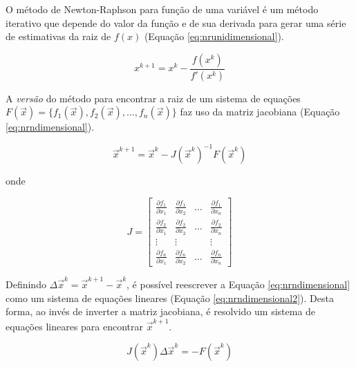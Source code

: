 \documentclass[final,5p]{elsarticle}
\numberwithin{equation}{section}
\begin{document}
        O método de Newton-Raphson para função de uma variável é um método iterativo que depende do valor da função e de sua derivada para gerar uma série de estimativas da raiz de $f(x)$ (Equação \ref{eq:nrunidimensional}).

        \begin{equation}
            x^{k+1} = x^{k} - \frac{f(x^k)}{f'(x^k)} \label{eq:nrunidimensional}
        \end{equation}

        A \emph{versão} do método para encontrar a raiz de um sistema de equações $F(\vec{x}) = \{f_1(\vec{x}), f_2(\vec{x}), \ldots, f_n(\vec{x})\}$ faz uso da matriz jacobiana (Equação \ref{eq:nrndimensional})\cite{burden2016analise}.

        \begin{equation}
            \vec{x}^{k+1} = \vec{x}^{k} - J(\vec{x}^k)^{-1}F(\vec{x}^k) \label{eq:nrndimensional}
        \end{equation}

        \noindent onde

        \begin{equation}
            J =
            \begin{bmatrix}
                \frac{\partial f_1}{\partial x_1} & \frac{\partial f_1}{\partial x_2} & \ldots & \frac{\partial f_1}{\partial x_n} \\
                \frac{\partial f_2}{\partial x_1} & \frac{\partial f_2}{\partial x_2} & \ldots & \frac{\partial f_2}{\partial x_n} \\
                \vdots     & \vdots     &        & \vdots  \\
                \frac{\partial f_n}{\partial x_1} & \frac{\partial f_n}{\partial x_2} & \ldots & \frac{\partial f_n}{\partial x_n}
            \end{bmatrix}
            \label{eq:jacobiano}
        \end{equation}

        Definindo $\Delta \vec{x}^{k} = \vec{x}^{k+1} - \vec{x}^{k}$, é possível reescrever a Equação \ref{eq:nrndimensional} como um sistema de equações lineares (Equação \ref{eq:nrndimensional2}). Desta forma, ao invés de inverter a matriz jacobiana, é resolvido um sistema de equações lineares para encontrar $\vec{x}^{k+1}$.

        \begin{equation}
            J(\vec{x}^k) \Delta \vec{x}^{k} = -F(\vec{x}^k) \label{eq:nrndimensional2}
        \end{equation}
\end{document}
